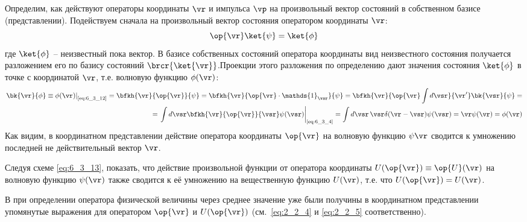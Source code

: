Определим, как действуют операторы координаты $\vr$ и импульса $\vp$ на произвольный вектор состояний в собственном базисе (представлении). Подействуем сначала на произвольный вектор состояния оператором координаты $\vr$:%
%
\begin{equation}
\label{eq:6_3_12}
\op{\vr} \ket{\psi} = \ket{\phi}
\end{equation}%
%
где $\ket{\phi}$ -- неизвестный пока вектор. В базисе собственных состояний оператора координаты вид неизвестного состояния получается разложением его по базису состояний $\brcr{\ket{\vr}}$.Проекции этого разложения по определению дают значения состояния $\ket{\phi}$ в точке с координатой $\vr$, т.е. волновую функцию $\phi(\vr)$:%
%
\begin{equation}
\label{eq:6_3_13}
\begin{split}
	\left.\bk{\vr}{\phi} \equiv \phi(\vr)\right|_{\text{\eqref{eq:6_3_12}}} =
	\bfkh{\vr}{\op{\vr}}{\psi} = 
	\bfkh{\vr}{\op{\vr} \cdot \mathds{1}_{\vsr}}{\psi} =
	\bfkh{\vr}{\op{\vr}\int d\vsr}{\vr'} \bk{\vsr}{\psi} = \\ =
	\left.\int d\vsr \bfkh{\vr}{\op{\vr}}{\vsr} \psi(\vsr) \right|_{\text{\eqref{eq:6_3_4}}} =
	\int d\vsr \, \vsr \delta(\vr - \vsr) \psi(\vsr) = \vr \psi(\vr) = \phi(\vr)
\end{split}
\end{equation}%
%
Как видим, в координатном представлении действие оператора координаты $\op{\vr}$ на волновую функцию $\psi{\vr}$ сводится к умножению последней не действительный вектор $\vr$.%
%
\begin{excr}
Следуя схеме \eqref{eq:6_3_13}, показать, что действие произвольной функции от оператора координаты $U(\op{\vr}) \equiv \op{U}(\vr)$ на волновую функцию $\psi(\vr)$ также сводится к её умножению на вещественную функцию $U(\vr)$, т.е. что $U(\op{\vr})=U(\vr)$.
\end{excr}%
%
В  при определении оператора физической величины через среднее значение уже были получины в координатном представлении упомянутые выражения для оператором $\op{\vr}$ и $U(\op{\vr})$ (см.~\eqref{eq:2_2_4} и \eqref{eq:2_2_5} соответственно).

